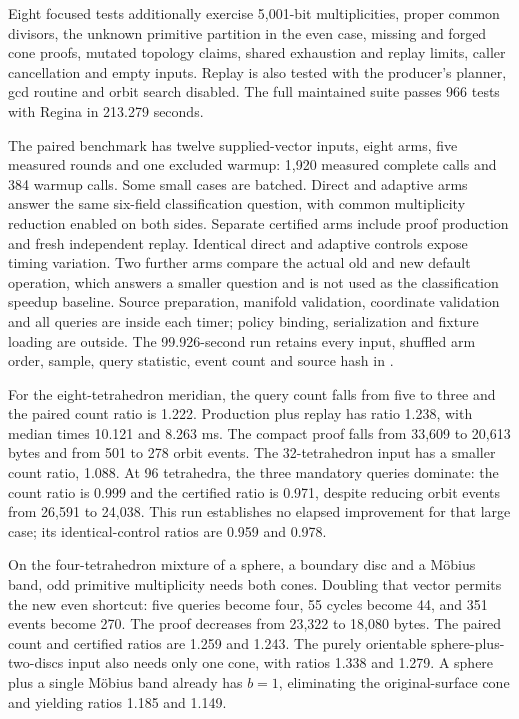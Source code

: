 Eight focused tests additionally exercise 5,001-bit multiplicities,
proper common divisors, the unknown primitive partition in the even case,
missing and forged cone proofs, mutated topology claims, shared exhaustion
and replay limits, caller cancellation and empty inputs. Replay is also
tested with the producer's planner, gcd routine and orbit search disabled.
The full maintained suite passes 966 tests with Regina in 213.279 seconds.



The paired benchmark has twelve supplied-vector inputs, eight arms, five
measured rounds and one excluded warmup: 1,920 measured complete calls and
384 warmup calls. Some small cases are batched. Direct and adaptive arms
answer the same six-field classification question, with common multiplicity
reduction enabled on both sides. Separate certified arms include proof
production and fresh independent replay. Identical direct and adaptive
controls expose timing variation. Two further arms compare the actual old
and new default operation, which answers a smaller question and is not
used as the classification speedup baseline. Source preparation, manifold
validation, coordinate validation and all queries are inside each timer;
policy binding, serialization and fixture loading are outside.
The 99.926-second run retains every input, shuffled arm order, sample,
query statistic, event count and source hash in
.

For the eight-tetrahedron meridian, the query count falls from five to
three and the paired count ratio is 1.222. Production plus replay has
ratio 1.238, with median times 10.121 and 8.263 ms. The compact proof falls
from 33,609 to 20,613 bytes and from 501 to 278 orbit events. The
32-tetrahedron input has a smaller count ratio, 1.088. At 96 tetrahedra,
the three mandatory queries dominate: the count ratio is 0.999 and the
certified ratio is 0.971, despite reducing orbit events from 26,591 to
24,038. This run establishes no elapsed improvement for that large case;
its identical-control ratios are 0.959 and 0.978.

On the four-tetrahedron mixture of a sphere, a boundary disc and a
M\"obius band, odd primitive multiplicity needs both cones. Doubling that
vector permits the new even shortcut: five queries become four, 55 cycles
become 44, and 351 events become 270. The proof decreases from 23,322 to
18,080 bytes. The paired count and certified ratios are 1.259 and 1.243.
The purely orientable sphere-plus-two-discs input also needs only one cone,
with ratios 1.338 and 1.279. A sphere plus a single M\"obius band already
has $b=1$, eliminating the original-surface cone and yielding ratios 1.185
and 1.149.

